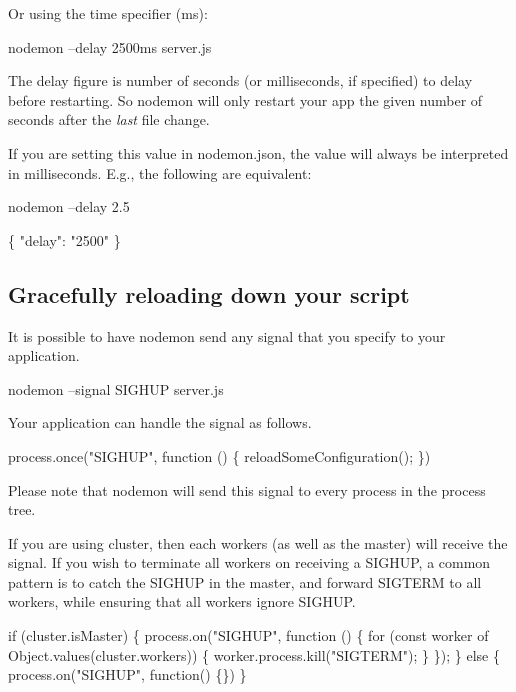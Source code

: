 Or using the time specifier (ms)\+:


\begin{DoxyCode}
nodemon --delay 2500ms server.js
\end{DoxyCode}


The delay figure is number of seconds (or milliseconds, if specified) to delay before restarting. So nodemon will only restart your app the given number of seconds after the {\itshape last} file change.

If you are setting this value in {\ttfamily nodemon.\+json}, the value will always be interpreted in milliseconds. E.\+g., the following are equivalent\+:


\begin{DoxyCode}
nodemon --delay 2.5

\{
  "delay": "2500"
\}
\end{DoxyCode}


\subsection*{Gracefully reloading down your script}

It is possible to have nodemon send any signal that you specify to your application.


\begin{DoxyCode}
nodemon --signal SIGHUP server.js
\end{DoxyCode}


Your application can handle the signal as follows.


\begin{DoxyCode}
process.once("SIGHUP", function () \{
  reloadSomeConfiguration();
\})
\end{DoxyCode}


Please note that nodemon will send this signal to every process in the process tree.

If you are using {\ttfamily cluster}, then each workers (as well as the master) will receive the signal. If you wish to terminate all workers on receiving a {\ttfamily S\+I\+G\+H\+UP}, a common pattern is to catch the {\ttfamily S\+I\+G\+H\+UP} in the master, and forward {\ttfamily S\+I\+G\+T\+E\+RM} to all workers, while ensuring that all workers ignore {\ttfamily S\+I\+G\+H\+UP}.


\begin{DoxyCode}
if (cluster.isMaster) \{
  process.on("SIGHUP", function () \{
    for (const worker of Object.values(cluster.workers)) \{
      worker.process.kill("SIGTERM");
    \}
  \});
\} else \{
  process.on("SIGHUP", function() \{\})
\}
\end{DoxyCode}


